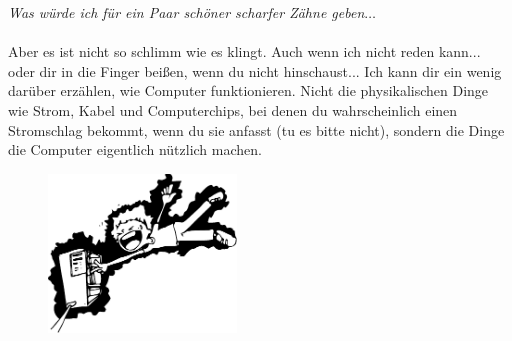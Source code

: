 \emph{Was würde ich für ein Paar schöner scharfer Zähne geben$\ldots$}
\\
\\
Aber es ist nicht so schlimm wie es klingt. Auch wenn ich nicht reden kann... oder dir in die Finger beißen, wenn du nicht hinschaust... Ich kann dir ein wenig darüber erzählen, wie Computer funktionieren. Nicht die physikalischen Dinge wie Strom, Kabel und Computerchips, bei denen du wahrscheinlich einen Stromschlag bekommt, wenn du sie anfasst (tu es bitte nicht), sondern die Dinge die Computer eigentlich nützlich machen.

\begin{figure}
  \begin{center}
\includegraphics*[width=50mm]{images/electrocute}
  \end{center}
\end{figure}

